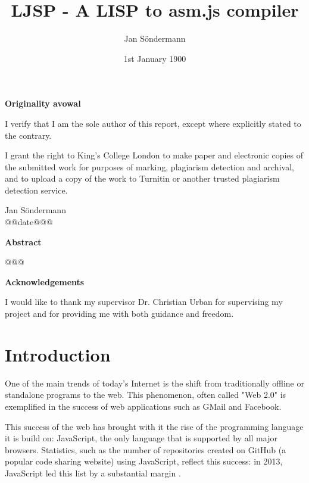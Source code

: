 \documentclass[11pt]{report}
\title{LJSP - A LISP to asm.js compiler}
\author{Jan S\"ondermann}
\date{1st January 1900}
\begin{document}


\maketitle

\onehalfspacing

\begin{center}
\textbf{Originality avowal}
\end{center}

I verify that I am the sole author of this report, except where explicitly stated to the contrary.

I grant the right to King's College London to make paper and electronic copies of the submitted work for purposes of marking, plagiarism detection and archival, and to upload a copy of the work to Turnitin or another trusted plagiarism detection service.

\begin{flushright}
Jan Söndermann \\
@@date@@@
\end{flushright}
\newpage
			
\begin{center}
\textbf{Abstract}
\end{center}

@@@
\newpage

\begin{center}
\textbf{Acknowledgements}
\end{center}
I would like to thank my supervisor Dr. Christian Urban for supervising my project and for providing me with both guidance and freedom.
\newpage

\tableofcontents
\newpage

\chapter{Introduction}
One of the main trends of today's Internet is the shift from traditionally offline or standalone programs to the web. This phenomenon, often called "Web 2.0" is exemplified in the success of web applications such as GMail and Facebook.

This success of the web has brought with it the rise of the programming language it is build on: JavaScript, the only language that is supported by all major browsers. Statistics, such as the number of repositories created on GitHub (a popular code sharing website) using JavaScript, reflect this success: in 2013, JavaScript led this list by a substantial margin \cite{githubarchive} \cite{topgithub}.
\end{document}
